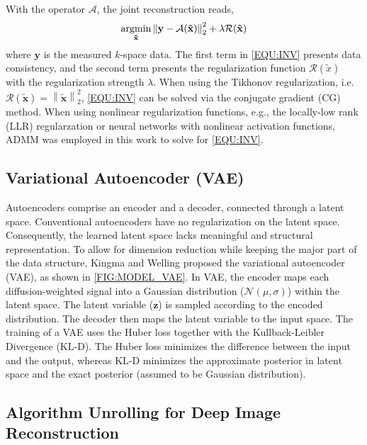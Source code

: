 \documentclass[journal,twoside,web]{ieeecolor}
\newcommand{\argmin}{\operatornamewithlimits{argmin}}
\newcommand{\norm}[1]{\left\lVert#1\right\rVert}
\begin{document}
	With the operator $\mathcal{A}$, the joint reconstruction reads,
	\begin{equation}
		\argmin_{\mathbf{\tilde{x}}} \norm{\mathbf{y} - \mathcal{A}(\mathbf{\tilde{x}})}_2^2 + \lambda \mathcal{R}(\mathbf{\tilde{x}})
		\label{EQU:INV}
	\end{equation}
	where $\mathbf{y}$ is the measured $k$-space data.
	The first term in \cref{EQU:INV} presents data consistency, and
	the second term presents the regularization function $\mathcal{R}(\tilde{x})$
	with the regularization strength $\lambda$.
	When using the Tikhonov regularization,
	i.e.~$\mathcal{R}(\mathbf{\tilde{x}}) = \norm{\mathbf{\tilde{x}}}_2^2$,
	\cref{EQU:INV} can be solved via the conjugate gradient (CG) method.
	When using nonlinear regularization functions,
	e.g., the locally-low rank (LLR) regularzation \cite{tan_2024_naviepi} or
	neural networks with nonlinear activation functions,
	ADMM was employed in this work to solve for \cref{EQU:INV}.

	\subsection{Variational Autoencoder (VAE)}

	Autoencoders comprise an encoder and a decoder, connected through a latent space.
	Conventional autoencoders have no regularization
	on the latent space.
	Consequently, the learned latent space lacks meaningful
	and structural representation.
	To allow for dimension reduction while keeping the major part of
	the data structure,
	Kingma and Welling \cite{kingma_2014_vae} proposed
	the variational autoencoder (VAE), as shown in \cref{FIG:MODEL_VAE}.
	In VAE, the encoder maps each diffusion-weighted signal
	into a Gaussian distribution ($\mathcal{N}(\mu, \sigma)$) within the latent space.
	The latent variable ($\mathbf{z}$) is sampled according to the encoded distribution.
	The decoder then maps the latent variable to the input space.
	The training of a VAE uses the Huber loss together with the Kullback-Leibler Divergence (KL-D).
	The Huber loss minimizes the difference between the input and the output,
	whereas KL-D minimizes the approximate posterior in latent space and
	the exact posterior (assumed to be Gaussian distribution).


	\subsection{Algorithm Unrolling for Deep Image Reconstruction}
\end{document}
